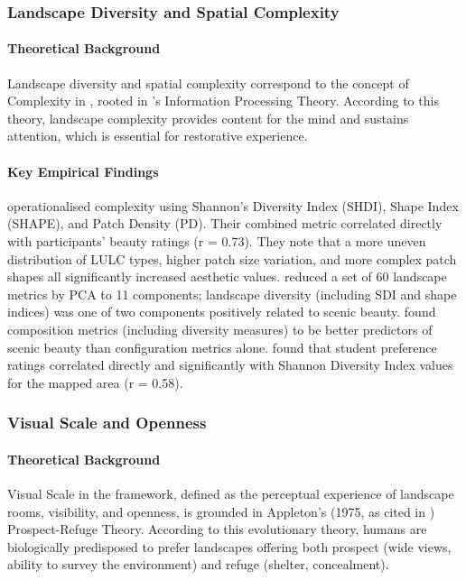 \documentclass[hidelinks, 11pt]{article}
\begin{document}
\subsubsection{Landscape Diversity and Spatial Complexity}\label{sec:LDSC}
\paragraph{Theoretical Background}
Landscape diversity and spatial complexity correspond to the concept of Complexity in \citet{ode_capturing_2008}, rooted in \citet{kaplan_experience_1989}'s Information Processing Theory. According to this theory, landscape complexity provides content for the mind and sustains attention, which is essential for restorative experience.

\paragraph{Key Empirical Findings}
\citet{frank_assessment_2013} operationalised complexity using Shannon's Diversity Index (SHDI), Shape Index (SHAPE), and Patch Density (PD). Their combined metric correlated directly with participants' beauty ratings (r = 0.73). They note that a more uneven distribution of LULC types, higher patch size variation, and more complex patch shapes all significantly increased aesthetic values. \citet{schirpke_predicting_2013} reduced a set of 60 landscape metrics by PCA to 11 components; landscape diversity (including SDI and shape indices) was one of two components positively related to scenic beauty. \citet{palmer_using_2004} found composition metrics (including diversity measures) to be better predictors of scenic beauty than configuration metrics alone. \citet{dramstad_relationships_2006} found that student preference ratings correlated directly and significantly with Shannon Diversity Index values for the mapped area (r = 0.58).

\subsubsection{Visual Scale and Openness}\label{sec:VSO}
\paragraph{Theoretical Background}
Visual Scale in the \citet{ode_capturing_2008} framework, defined as the perceptual experience of landscape rooms, visibility, and openness, is grounded in Appleton's (1975, as cited in \citet{tveit_key_2006}) Prospect-Refuge Theory. According to this evolutionary theory, humans are biologically predisposed to prefer landscapes offering both prospect (wide views, ability to survey the environment) and refuge (shelter, concealment).
\end{document}

